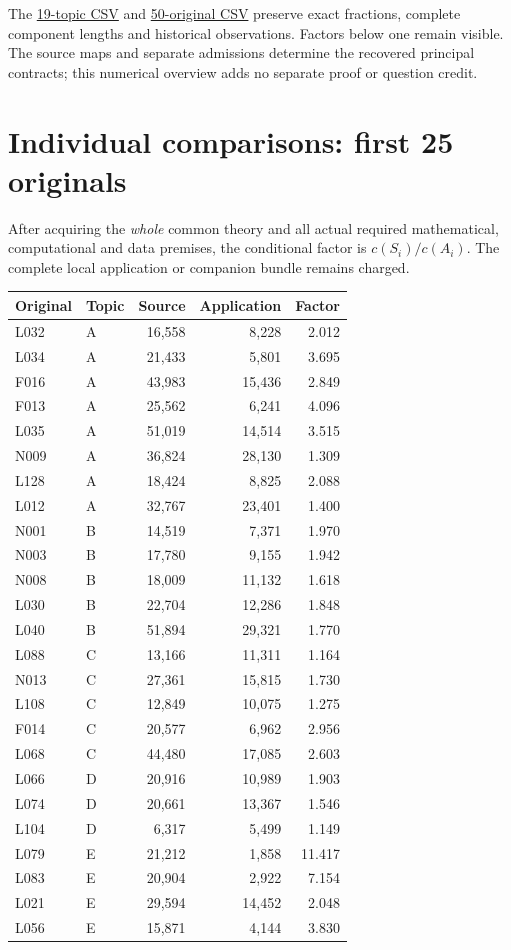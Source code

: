 \documentclass[11pt,a4paper]{article}
\begin{document}
The \href{topics.csv}{19-topic CSV} and \href{applications.csv}{50-original CSV} preserve exact fractions, complete component lengths and historical observations. Factors below one remain visible. The source maps and separate admissions determine the recovered principal contracts; this numerical overview adds no separate proof or question credit.
\newpage
\section*{Individual comparisons: first 25 originals}
After acquiring the \emph{whole} common theory and all actual required mathematical, computational and data premises, the conditional factor is $c(S_i)/c(A_i)$. The complete local application or companion bundle remains charged.
\begin{center}\small\begin{tabular}{llrrr}\toprule
Original & Topic & Source & Application & Factor\\\midrule
L032 & A & 16,558 & 8,228 & 2.012 \\
L034 & A & 21,433 & 5,801 & 3.695 \\
F016 & A & 43,983 & 15,436 & 2.849 \\
F013 & A & 25,562 & 6,241 & 4.096 \\
L035 & A & 51,019 & 14,514 & 3.515 \\
N009 & A & 36,824 & 28,130 & 1.309 \\
L128 & A & 18,424 & 8,825 & 2.088 \\
L012 & A & 32,767 & 23,401 & 1.400 \\
N001 & B & 14,519 & 7,371 & 1.970 \\
N003 & B & 17,780 & 9,155 & 1.942 \\
N008 & B & 18,009 & 11,132 & 1.618 \\
L030 & B & 22,704 & 12,286 & 1.848 \\
L040 & B & 51,894 & 29,321 & 1.770 \\
L088 & C & 13,166 & 11,311 & 1.164 \\
N013 & C & 27,361 & 15,815 & 1.730 \\
L108 & C & 12,849 & 10,075 & 1.275 \\
F014 & C & 20,577 & 6,962 & 2.956 \\
L068 & C & 44,480 & 17,085 & 2.603 \\
L066 & D & 20,916 & 10,989 & 1.903 \\
L074 & D & 20,661 & 13,367 & 1.546 \\
L104 & D & 6,317 & 5,499 & 1.149 \\
L079 & E & 21,212 & 1,858 & 11.417 \\
L083 & E & 20,904 & 2,922 & 7.154 \\
L021 & E & 29,594 & 14,452 & 2.048 \\
L056 & E & 15,871 & 4,144 & 3.830 \\\bottomrule\end{tabular}\end{center}
\end{document}
